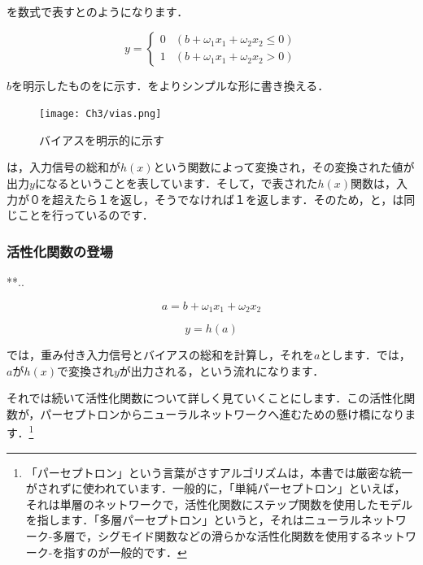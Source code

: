 を数式で表すとのようになります．

\begin{equation}
    \label{eq:3_peceptron}
    y = \left\{
\begin{array}{ll}
0 & (b + \omega_1 x_1 + \omega_2 x_2 \le 0)\\
1 & (b + \omega_1 x_1 + \omega_2 x_2 > 0)
\end{array}
    \right.
\end{equation}

$b$を明示したものをに示す．をよりシンプルな形に書き換える．

\begin{figure}[h]
  \vspace{0mm}
  \begin{center}
    \hspace{0mm}
    \centering
    \texttt{[image: Ch3/vias.png]} \
    \vspace{0mm}
    \caption{バイアスを明示的に示す}
    \label{fig:3_vias}
  \end{center}
\end{figure}




は，入力信号の総和が$h(x)$という関数によって変換され，その変換された値が出力$y$になるということを表しています．そして，で表された$h(x)$関数は，入力が０を超えたら１を返し，そうでなければ１を返します．そのため，と，は同じことを行っているのです．

\subsubsection{活性化関数の登場}
**..

\begin{equation}
    \label{eq:3_peceptron_simple2}
a=b+\omega_1 x_1 + \omega_2 x_2
\end{equation}

\begin{equation}
    \label{eq:3_step_function2}
y=h(a)
\end{equation}

では，重み付き入力信号とバイアスの総和を計算し，それを$a$とします．では，$a$が$h(x)$で変換され$y$が出力される，という流れになります．

それでは続いて活性化関数について詳しく見ていくことにします．この活性化関数が，パーセプトロンからニューラルネットワークへ進むための懸け橋になります．\footnote{「パーセプトロン」という言葉がさすアルゴリズムは，本書では厳密な統一がされずに使われています．一般的に，「単純パーセプトロン」といえば，それは単層のネットワークで，活性化関数にステップ関数を使用したモデルを指します．「多層パーセプトロン」というと，それはニューラルネットワーク-多層で，シグモイド関数などの滑らかな活性化関数を使用するネットワーク-を指すのが一般的です．
}



